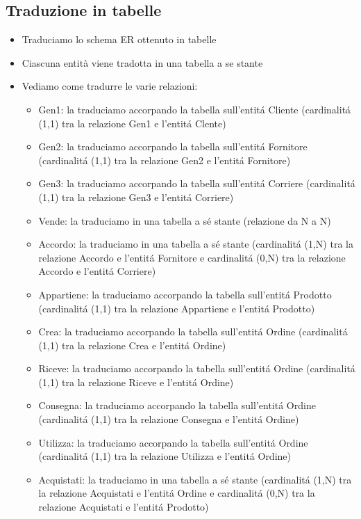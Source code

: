 \subsection{Traduzione in tabelle}
\begin{itemize}
	\item Traduciamo lo schema ER ottenuto in tabelle
	\item Ciascuna entità viene tradotta in una tabella a se stante
	\item Vediamo come tradurre le varie relazioni:
	\begin{itemize}
		\item Gen1: la traduciamo accorpando la tabella sull’entitá Cliente (cardinalitá (1,1) tra la relazione Gen1 e
		l’entitá Clente) 
		\item Gen2: la traduciamo accorpando la tabella sull’entitá Fornitore (cardinalitá (1,1) tra la relazione Gen2 e
		l’entitá Fornitore) 
		\item Gen3: la traduciamo accorpando la tabella sull’entitá Corriere (cardinalitá (1,1) tra la relazione Gen3 e
		l’entitá Corriere) 
		\item Vende: la traduciamo in una tabella a sé stante (relazione da N a N)
		\item Accordo: la traduciamo in una tabella a sé stante (cardinalitá (1,N) tra la relazione Accordo e l’entitá Fornitore e cardinalitá (0,N) tra la relazione Accordo e l’entitá Corriere) 
		\item Appartiene: la traduciamo accorpando la tabella sull’entitá Prodotto (cardinalitá (1,1) tra la relazione Appartiene e l’entitá Prodotto) 
		\item Crea: la traduciamo accorpando la tabella sull’entitá Ordine (cardinalitá (1,1) tra la relazione Crea e
		l’entitá Ordine) 
		\item Riceve: la traduciamo accorpando la tabella sull’entitá Ordine (cardinalitá (1,1) tra la relazione Riceve e
		l’entitá Ordine) 
		\item Consegna: la traduciamo accorpando la tabella sull’entitá Ordine (cardinalitá (1,1) tra la relazione Consegna e l’entitá Ordine)
		\item Utilizza: la traduciamo accorpando la tabella
		sull’entitá Ordine (cardinalitá (1,1) tra la relazione
		Utilizza e l’entitá Ordine) 
		\item Acquistati: la traduciamo in una tabella a sé stante
		(cardinalitá (1,N) tra la relazione Acquistati e l’entitá
		Ordine e cardinalitá (0,N) tra la relazione Acquistati
		e l’entitá Prodotto) 

\end{itemize}
\end{itemize}
